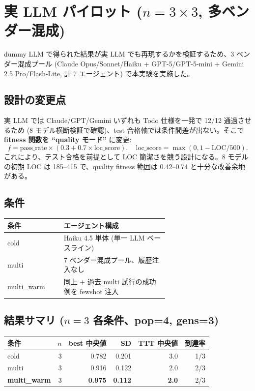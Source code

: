 \documentclass[a4paper,11pt]{ltjsarticle}
\begin{document}
\section{実 LLM パイロット ($n=3 \times 3$, 多ベンダー混成)}

dummy LLM で得られた結果が実 LLM でも再現するかを検証するため、3 ベンダー混成プール (Claude Opus/Sonnet/Haiku + GPT-5/GPT-5-mini + Gemini 2.5 Pro/Flash-Lite, 計 7 エージェント) で本実験を実施した。

\subsection{設計の変更点}

実 LLM では Claude/GPT/Gemini いずれも Todo 仕様を一発で 12/12 通過させるため (8 モデル横断検証で確認)、test 合格軸では条件間差が出ない。そこで \textbf{fitness 関数を ``quality モード''} に変更:
\[
f = \text{pass\_rate} \times (0.3 + 0.7 \times \text{loc\_score}), \quad \text{loc\_score} = \max(0, 1 - \text{LOC}/500).
\]
これにより、テスト合格を前提として LOC 簡潔さを競う設計になる。8 モデルの初期 LOC は 185--415 で、quality fitness 範囲は 0.42--0.74 と十分な改善余地がある。

\subsection{条件}

\begin{center}
\begin{tabular}{@{}lp{0.65\linewidth}@{}}
\toprule
条件 & エージェント構成 \\
\midrule
cold       & Haiku 4.5 単体 (単一 LLM ベースライン) \\
multi      & 7 ベンダー混成プール、履歴注入なし \\
multi\_warm & 同上 + 過去 multi 試行の成功例を fewshot 注入 \\
\bottomrule
\end{tabular}
\end{center}

\subsection{結果サマリ ($n=3$ 各条件、pop=4, gens=3)}

\begin{center}
\begin{tabular}{@{}lrrrrr@{}}
\toprule
条件 & $n$ & best 中央値 & SD & TTT 中央値 & 到達率 \\
\midrule
cold        & 3 & 0.782 & 0.201 & 3.0 & 1/3 \\
multi       & 3 & 0.916 & 0.122 & 2.0 & 2/3 \\
\textbf{multi\_warm} & 3 & \textbf{0.975} & \textbf{0.112} & \textbf{2.0} & 2/3 \\
\bottomrule
\end{tabular}
\end{center}
\end{document}
